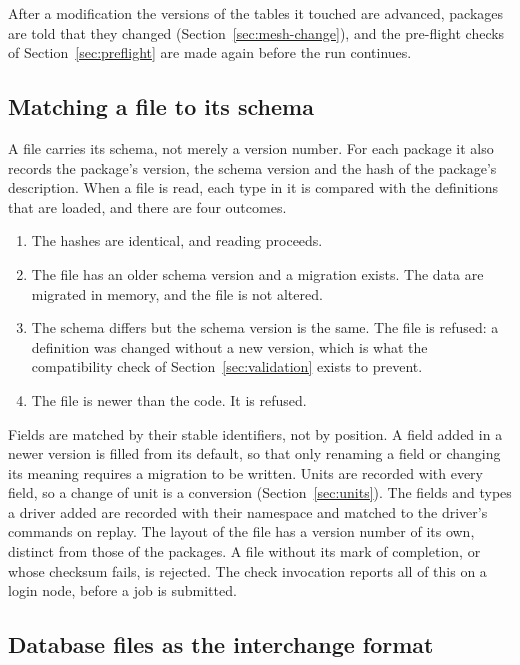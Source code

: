 \documentclass[11pt,a4paper]{article}
\begin{document}
After a modification the versions of the tables it touched are advanced,
packages are told that they changed (Section~\ref{sec:mesh-change}), and
the pre-flight checks of Section~\ref{sec:preflight} are made again before
the run continues.

\subsection{Matching a file to its schema}
\label{sec:file-schema}

A file carries its schema, not merely a version number.  For each package
it also records the package's version, the schema version and the hash of
the package's description.  When a file is read, each type in it is compared
with the definitions that are loaded, and there are four outcomes.

\begin{enumerate}
  \item The hashes are identical, and reading proceeds.
  \item The file has an older schema version and a migration exists.  The
        data are migrated in memory, and the file is not altered.
  \item The schema differs but the schema version is the same.  The file is
        refused: a definition was changed without a new version, which is
        what the compatibility check of Section~\ref{sec:validation} exists
        to prevent.
  \item The file is newer than the code.  It is refused.
\end{enumerate}

Fields are matched by their stable identifiers, not by position.  A field
added in a newer version is filled from its default, so that only renaming
a field or changing its meaning requires a migration to be written.  Units
are recorded with every field, so a change of unit is a conversion
(Section~\ref{sec:units}).  The fields and types a driver added are
recorded with their namespace and matched to the driver's commands on
replay.  The layout of the file has a version number of its own, distinct
from those of the packages.  A file without its mark of completion, or
whose checksum fails, is rejected.  The check invocation reports all of
this on a login node, before a job is submitted.

\subsection{Database files as the interchange format}
\label{sec:interchange}
\end{document}
